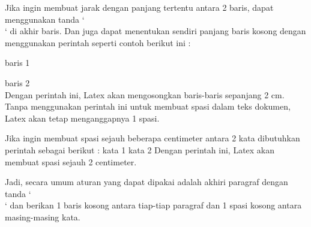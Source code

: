 Jika ingin membuat jarak dengan panjang tertentu antara 2 baris, dapat menggunakan tanda ‘ \\ ‘ di akhir baris. Dan juga dapat menentukan sendiri panjang baris kosong dengan menggunakan perintah seperti contoh berikut ini :

baris 1 \\

\vspace{2cm}

baris 2 \\
Dengan perintah ini, Latex akan mengosongkan baris-baris sepanjang 2 cm. Tanpa menggunakan perintah ini untuk membuat spasi dalam teks dokumen, Latex akan tetap menganggapnya 1 spasi.

Jika ingin membuat spasi sejauh beberapa centimeter antara 2 kata dibutuhkan perintah sebagai berikut :
kata 1 \hspace{2cm} kata 2
Dengan perintah ini, Latex akan membuat spasi sejauh 2 centimeter.

Jadi, secara umum aturan yang dapat dipakai adalah akhiri paragraf dengan tanda ‘ \\ ‘ dan berikan 1 baris kosong antara tiap-tiap paragraf dan 1 spasi kosong antara masing-masing kata.

